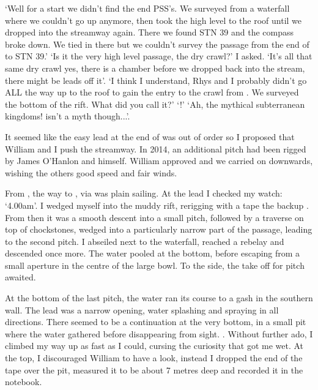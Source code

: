 `Well for a start we didn't find the end PSS's. We surveyed from a waterfall where we couldn't go up anymore, then took the high level to the roof until we dropped into the streamway again. There we found  STN 39 and the compass broke down. We tied in there but we couldn't survey the passage from the end of  to STN 39.'
`Is it the very high level passage, the dry crawl?' I asked.
`It's all that same dry crawl yes, there is a chamber before we dropped back into the stream, there might be leads off it'.
`I think I understand, Rhys and I probably didn't go ALL the way up to the roof to gain the entry to the crawl from . We surveyed the bottom of the rift. What did you call it?'
`!'
`Ah, the mythical subterranean kingdoms!  isn't a myth though...'.

\mydelimiter

It seemed like the easy lead at the end of  was out of order so I proposed that William and I push the  streamway. In 2014, an additional pitch had been rigged by James O'Hanlon and himself. William approved and we carried on downwards, wishing the others good speed and fair winds.

From , the way to , via  was plain sailing. At the lead I checked my watch: `4.00am'. I wedged myself into the muddy rift, rerigging with a tape the backup . From then it was a smooth descent into a small pitch, followed by a traverse on top of chockstones, wedged into a particularly narrow part of the passage, leading to the second pitch. I abseiled next to the waterfall, reached a rebelay and descended once more. The water pooled at the bottom, before escaping from a small aperture in the centre of the large bowl. To the side, the take off for  pitch awaited.

At the bottom of the last pitch, the water ran its course to a gash in the southern wall. The lead was a narrow opening, water splashing and spraying in all directions. There seemed to be a continuation at the very bottom, in a small pit where the water gathered before disappearing from sight. . Without further ado, I climbed my way up as fast as I could, cursing the curiosity that got me wet. At the top, I discouraged William to have a look, instead I dropped the end of the tape over the pit, measured it to be about 7 metres deep and recorded it in the notebook.

